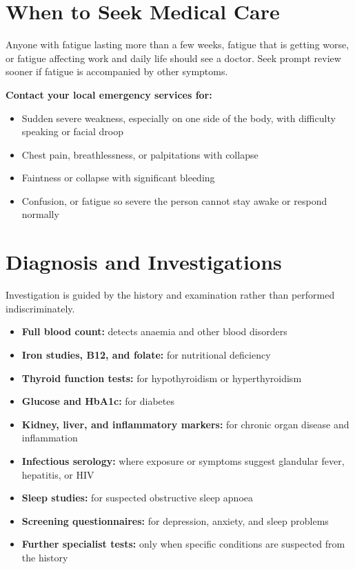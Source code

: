 \section*{When to Seek Medical Care}
Anyone with fatigue lasting more than a few weeks, fatigue that is getting worse, or fatigue affecting work and daily life should see a doctor. Seek prompt review sooner if fatigue is accompanied by other symptoms.

\textbf{Contact your local emergency services for:}
\begin{itemize}
    \item Sudden severe weakness, especially on one side of the body, with difficulty speaking or facial droop
    \item Chest pain, breathlessness, or palpitations with collapse
    \item Faintness or collapse with significant bleeding
    \item Confusion, or fatigue so severe the person cannot stay awake or respond normally
\end{itemize}

\section*{Diagnosis and Investigations}
Investigation is guided by the history and examination rather than performed indiscriminately.
\begin{itemize}
    \item \textbf{Full blood count:} detects anaemia and other blood disorders
    \item \textbf{Iron studies, B12, and folate:} for nutritional deficiency
    \item \textbf{Thyroid function tests:} for hypothyroidism or hyperthyroidism
    \item \textbf{Glucose and HbA1c:} for diabetes
    \item \textbf{Kidney, liver, and inflammatory markers:} for chronic organ disease and inflammation
    \item \textbf{Infectious serology:} where exposure or symptoms suggest glandular fever, hepatitis, or HIV
    \item \textbf{Sleep studies:} for suspected obstructive sleep apnoea
    \item \textbf{Screening questionnaires:} for depression, anxiety, and sleep problems
    \item \textbf{Further specialist tests:} only when specific conditions are suspected from the history
\end{itemize}

